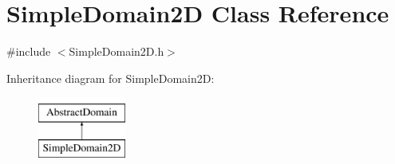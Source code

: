 \hypertarget{class_simple_domain2_d}{}\section{Simple\+Domain2D Class Reference}
\label{class_simple_domain2_d}


{\ttfamily \#include $<$Simple\+Domain2\+D.\+h$>$}

Inheritance diagram for Simple\+Domain2D\+:\begin{figure}[H]
\begin{center}
\leavevmode
\includegraphics[height=2.000000cm]{class_simple_domain2_d}
\end{center}
\end{figure}
